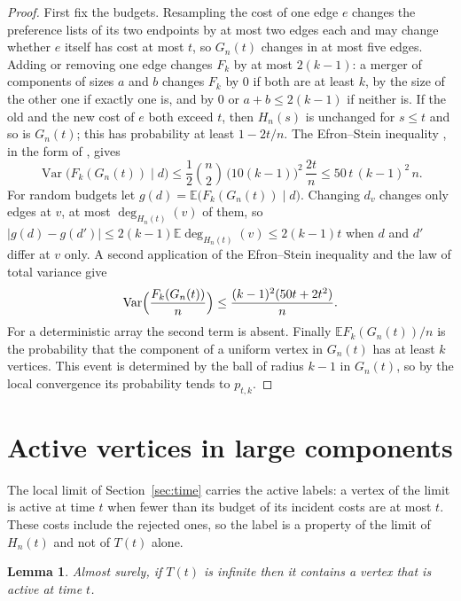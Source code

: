 \documentclass[11pt]{amsart}
\newtheorem{lemma}[theorem]{Lemma}
\theoremstyle{remark}
\numberwithin{equation}{section}
\newcommand{\E}{\mathbb E}
\newcommand{\1}{\mathbf 1}
\begin{document}
\begin{proof}
First fix the budgets. Resampling the cost of one edge $e$ changes the preference lists of its two endpoints by at most two edges each and may change whether $e$ itself has cost at most $t$, so $G_n(t)$ changes in at most five edges. Adding or removing one edge changes $F_k$ by at most $2(k-1)$: a merger of components of sizes $a$ and $b$ changes $F_k$ by $0$ if both are at least $k$, by the size of the other one if exactly one is, and by $0$ or $a+b\le2(k-1)$ if neither is. If the old and the new cost of $e$ both exceed $t$, then $H_n(s)$ is unchanged for $s\le t$ and so is $G_n(t)$; this has probability at least $1-2t/n$. The Efron--Stein inequality \cite{ES,Steele}, in the form of \cite[Theorem~3.1]{BLM}, gives
\[
\operatorname{Var}\bigl(F_k(G_n(t))\mid d\bigr)\le\frac12\binom n2\,\bigl(10(k-1)\bigr)^2\,\frac{2t}{n}\le50\,t\,(k-1)^2\,n .
\]
For random budgets let $g(d)=\E\bigl(F_k(G_n(t))\mid d\bigr)$. Changing $d_v$ changes only edges at $v$, at most $\deg_{H_n(t)}(v)$ of them, so $|g(d)-g(d')|\le2(k-1)\E\deg_{H_n(t)}(v)\le2(k-1)t$ when $d$ and $d'$ differ at $v$ only. A second application of the Efron--Stein inequality and the law of total variance give
\[
\operatorname{Var}\Bigl(\frac{F_k(G_n(t))}{n}\Bigr)\le\frac{(k-1)^2(50t+2t^2)}{n}.
\]
For a deterministic array the second term is absent. Finally $\E F_k(G_n(t))/n$ is the probability that the component of a uniform vertex in $G_n(t)$ has at least $k$ vertices. This event is determined by the ball of radius $k-1$ in $G_n(t)$, so by the local convergence its probability tends to $p_{t,k}$.
\end{proof}

\section{Active vertices in large components}\label{sec:active}

The local limit of Section~\ref{sec:time} carries the active labels: a vertex of the limit is active at time $t$ when fewer than its budget of its incident costs are at most $t$. These costs include the rejected ones, so the label is a property of the limit of $H_n(t)$ and not of $T(t)$ alone.

\begin{lemma}\label{lem:active}
Almost surely, if $T(t)$ is infinite then it contains a vertex that is active at time $t$.
\end{lemma}
\end{document}
